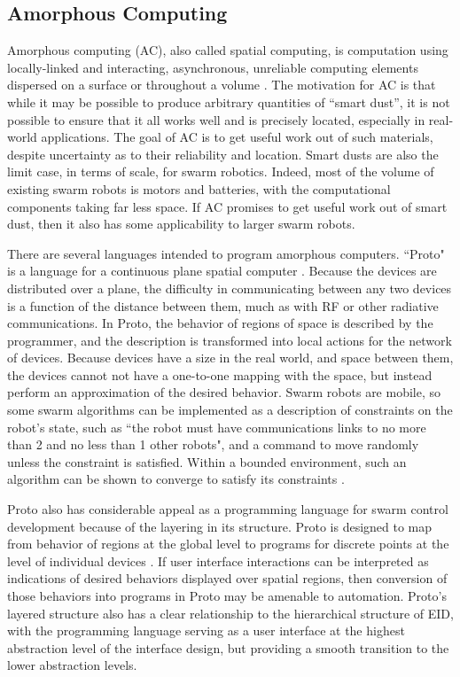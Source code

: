 \subsection{Amorphous Computing}

Amorphous computing (AC), also called spatial computing, is computation using locally-linked and interacting, asynchronous, unreliable computing elements dispersed on a surface or throughout a volume \citep{abelson2000amorphous}. 
The motivation for AC is that while it may be possible to produce arbitrary quantities of ``smart dust'', it is not possible to ensure that it all works well and is precisely located, especially in real-world applications.
The goal of AC is to get useful work out of such materials, despite uncertainty as to their reliability and location. 
Smart dusts are also the limit case, in terms of scale, for swarm robotics. 
Indeed, most of the volume of existing swarm robots is motors and batteries, with the computational components taking far less space. 
If AC promises to get useful work out of smart dust, then it also has some applicability to larger swarm robots.

There are several languages intended to program amorphous computers. 
``Proto" is a language for a continuous plane spatial computer \citep{correll2009ad}.
Because the devices are distributed over a plane, the difficulty in communicating between any two devices is a function of the distance between them, much as with RF or other radiative communications.
In Proto, the behavior of regions of space is described by the programmer, and the description is transformed into local actions for the network of devices. 
Because devices have a size in the real world, and space between them, the devices cannot not have a one-to-one mapping with the space, but instead perform an approximation of the desired behavior. 
Swarm robots are mobile, so some swarm algorithms can be implemented as a description of constraints on the robot's state, such as ``the robot must have communications links to no more than 2 and no less than 1 other robots", and a command to move randomly unless the constraint is satisfied. 
Within a bounded environment, such an algorithm can be shown to converge to satisfy its constraints \citep{correll2009ad}. 

Proto also has considerable appeal as a programming language for swarm control development because of the layering in its structure. 
Proto is designed to map from behavior of regions at the global level to programs for discrete points at the level of individual devices \citep{beal2006infrastructure}. 
If user interface interactions can be interpreted as indications of desired behaviors displayed over spatial regions, then conversion of those behaviors into programs in Proto may be amenable to automation. 
Proto's layered structure also has a clear relationship to the hierarchical structure of EID, with the programming language serving as a user interface at the highest abstraction level of the interface design, but providing a smooth transition to the lower abstraction levels.  


